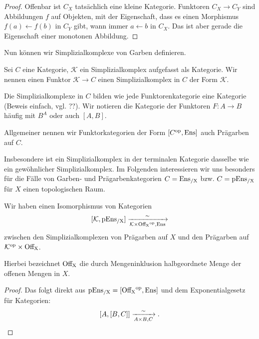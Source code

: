 \begin{proof}
  Offenbar ist $C_X$ tatsächlich eine kleine Kategorie. Funktoren $C_X
  \to C_Y$ sind Abbildungen $f$ auf Objekten, mit der Eigenschaft,
  dass es einen Morphismus $f(a) \leftarrow f(b)$ in $C_Y$ gibt, wann
  immer $a \leftarrow b$ in $C_X$. Das ist aber gerade die Eigenschaft
  einer monotonen Abbildung.
\end{proof}

Nun können wir Simplizialkomplexe von Garben definieren.

\begin{defn}
  Sei $C$ eine Kategorie, $\mathcal{K}$ ein Simplizialkomplex
  aufgefasst als Kategorie. Wir nennen einen Funktor $\mathcal{K} \to
  C$ einen Simplizialkomplex in $C$ der Form $\mathcal{K}$.
\end{defn}

Die Simplizialkomplexe in $C$ bilden wie jede Funktorenkategorie eine
Kategorie (Beweis einfach, vgl. ??). Wir notieren die Kategorie der
Funktoren $F: A \to B$ häufig mit $B^A$ oder auch $[A, B]$.

Allgemeiner nennen wir Funktorkategorien der Form $[C^\mathrm{op}, \operatorname{Ens}]$ auch
Prägarben auf $C$.

Insbesondere ist ein Simplizialkomplex in der terminalen Kategorie
dasselbe wie ein gewöhnlicher Simplizialkomplex. Im Folgenden
interessieren wir uns besonders für die Fälle von Garben- und
Prägarbenkategorien $C = \operatorname{Ens_{/X}}$ bzw. $C = \operatorname{pEns_{/X}}$ für $X$ einen
topologischen Raum.

\begin{lemma}
  Wir haben einen Isomorphismus von Kategorien
  \[
    [\mathcal{K}, \operatorname{pEns_{/X}}] \xrightarrow[\mathcal{K} \times \operatorname{Off_X}^\mathrm{op}, \operatorname{Ens}]{\sim}
  \]    
  zwischen den Simplizialkomplexen von Prägarben auf $X$ und den
  Prägarben auf $\mathcal{K}^\mathrm{op} \times \operatorname{Off_X}$.
\end{lemma}

Hierbei bezeichnet $\operatorname{Off_X}$ die durch Mengeninklusion halbgeordnete
Menge der offenen Mengen in $X$.

\begin{proof}
  Das folgt direkt aus $\operatorname{pEns_{/X}} = [\operatorname{Off_X}^\mathrm{op}, \operatorname{Ens}]$ und dem
  Exponentialgesetz für Kategorien:
  \[ [A, [B, C]] \xrightarrow[A \times B, C]{\sim}. \]
\end{proof}

